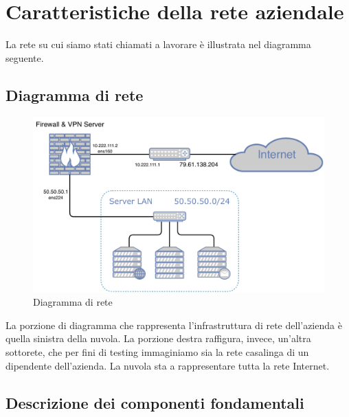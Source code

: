 \section{Caratteristiche della rete aziendale}
La rete su cui siamo stati chiamati a lavorare è illustrata nel diagramma seguente.
\subsection{Diagramma di rete}
\begin{figure}[h]
    \centering
    \includegraphics[width=14cm]{figure/networkDiagram.pdf}
    \caption{Diagramma di rete}
\end{figure}
La porzione di diagramma che rappresenta l'infrastruttura di rete dell'azienda è quella sinistra della nuvola. La porzione destra raffigura, invece, un'altra sottorete, che per fini di testing immaginiamo sia la rete casalinga di un dipendente dell'azienda. La nuvola sta a rappresentare tutta la rete Internet.

\subsection{Descrizione dei componenti fondamentali}
